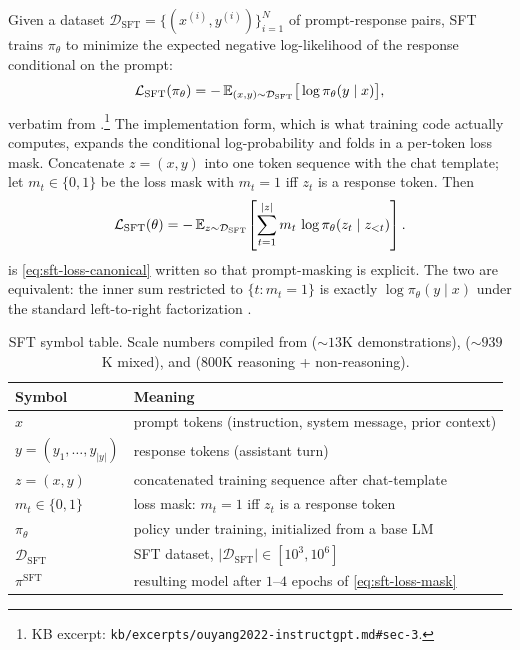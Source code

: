 Given a dataset $\mathcal{D}_{\mathrm{SFT}} = \{(x^{(i)}, y^{(i)})\}_{i=1}^N$
of prompt-response pairs, SFT trains $\pi_\theta$ to minimize the
expected negative log-likelihood of the response conditional on the
prompt:
\begin{equation}
\mathcal{L}_{\mathrm{SFT}}(\pi_\theta)
  = -\operatorname{\mathbb{E}}_{(x,y)\sim\mathcal{D}_{\mathrm{SFT}}}
       \!\big[\log \pi_\theta(y \mid x)\big],
\label{eq:sft-loss-canonical}
\end{equation}
verbatim from \citet[\S 3]{ouyang2022-instructgpt}.\footnote{KB excerpt:
\texttt{kb/excerpts/ouyang2022-instructgpt.md\#sec-3}.} The
implementation form, which is what training code actually computes,
expands the conditional log-probability and folds in a per-token loss
mask. Concatenate $z = (x, y)$ into one token sequence with the chat
template; let $m_t \in \{0, 1\}$ be the loss mask with $m_t = 1$ iff
$z_t$ is a response token. Then
\begin{equation}
\mathcal{L}_{\mathrm{SFT}}(\theta)
  = -\operatorname{\mathbb{E}}_{z \sim \mathcal{D}_{\mathrm{SFT}}}
       \!\left[\sum_{t=1}^{|z|} m_t \, \log \pi_\theta(z_t \mid z_{<t})\right].
\label{eq:sft-loss-mask}
\end{equation}
 is \cref{eq:sft-loss-canonical} written so that
prompt-masking is explicit. The two are equivalent: the inner sum
restricted to $\{t : m_t = 1\}$ is exactly $\log \pi_\theta(y \mid x)$
under the standard left-to-right factorization
\citep[\S 3.5]{ouyang2022-instructgpt}.

\begin{table}[h]
\centering
\small
\begin{tabular}{ll}
\toprule
Symbol & Meaning \\
\midrule
$x$ & prompt tokens (instruction, system message, prior context) \\
$y = (y_1, \ldots, y_{|y|})$ & response tokens (assistant turn) \\
$z = (x, y)$ & concatenated training sequence after chat-template \\
$m_t \in \{0, 1\}$ & loss mask: $m_t = 1$ iff $z_t$ is a response token \\
$\pi_\theta$ & policy under training, initialized from a base LM \\
$\mathcal{D}_{\mathrm{SFT}}$ & SFT dataset, $|\mathcal{D}_{\mathrm{SFT}}| \in [10^3, 10^6]$ \\
$\pi^{\mathrm{SFT}}$ & resulting model after $1$--$4$ epochs of \cref{eq:sft-loss-mask} \\
\bottomrule
\end{tabular}
\caption{SFT symbol table. Scale numbers compiled from
\citet[\S 3.4]{ouyang2022-instructgpt} ($\sim\!13$K demonstrations),
\citet{tulu3} ($\sim\!939$K mixed), and \citet[\S 4]{deepseek-r1}
($800$K reasoning + non-reasoning).}
\label{tab:sft-symbols}
\end{table}

